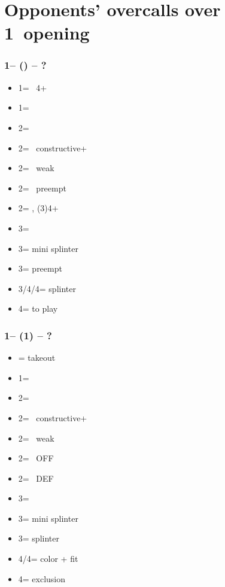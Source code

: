 \documentclass[12pt, a4paper]{report}
\begin{document}
{{{        }

        \section*{\colorbox{blue!30}{Opponents' overcalls over 1\hearts\ opening}}
         {

            \subsubsection*{1\hearts -- (\dbl) -- ?}
            \begin{itemize}
                \item 1\spades = \nat\ 4+\spades
                \item 1\nt = \trsf{\clubs}
                \item 2\clubs = \trsf{\diams}
                \item 2\diams = \hearts\ constructive+
                \item 2\hearts = \hearts\ weak
                \item 2\spades = \nat\ preempt
                \item 2\nt = \invp, (3)4+\hearts
                \item 3\clubs = \mixed
                \item 3\diams = mini splinter \gf
                \item 3\hearts = preempt
                \item 3\spades/4\clubs/4\diams = splinter
                \item 4\spades = to play
            \end{itemize}

            \subsubsection*{1\hearts -- (1\spades) -- ?}
            \begin{itemize}
                \item \dbl = takeout
                \item 1\nt = \trsf{\clubs}
                \item 2\clubs = \trsf{\diams}
                \item 2\diams = \hearts\ constructive+
                \item 2\hearts = \hearts\ weak
                \item 2\spades = \invp\ \small{OFF}
                \item 2\nt = \invp\ \small{DEF}
                \item 3\clubs = \mixed
                \item 3\diams = mini splinter \gf
                \item 3\spades = splinter
                \item 4\clubs/4\diams = color + fit
                \item 4\spades = exclusion
            \end{itemize}

}}}
\end{document}
